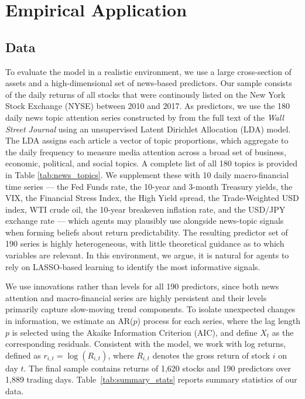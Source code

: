 \section{Empirical Application}\label{sec:empirical}

\subsection{Data}

To evaluate the model in a realistic environment, we use a large cross-section of assets and a high-dimensional set of news-based predictors.
Our sample consists of the daily returns of all stocks that were continously listed on the New York Stock Exchange (NYSE) between 2010 and 2017.
As predictors, we use the 180 daily news topic attention series constructed by \citet{Bybee2021} from the full text of the \textit{Wall Street Journal} using an unsupervised Latent Dirichlet Allocation (LDA) model.
The LDA assigns each article a vector of topic proportions, which \citet{Bybee2021} aggregate to the daily frequency to measure media attention across a broad set of business, economic, political, and social topics.
A complete list of all 180 topics is provided in Table \ref{tab:news_topics}.
We supplement these with 10 daily macro-financial time series — the Fed Funds rate, the 10-year and 3-month Treasury yields, the VIX, the Financial Stress Index, the High Yield spread, the Trade-Weighted USD index, WTI crude oil, the 10-year breakeven inflation rate, and the USD/JPY exchange rate — which agents may plausibly use alongside news-topic signals when forming beliefs about return predictability.
The resulting predictor set of 190 series is highly heterogeneous, with little theoretical guidance as to which variables are relevant.
In this environment, we argue, it is natural for agents to rely on LASSO-based learning to identify the most informative signals.

We use innovations rather than levels for all 190 predictors, since both news attention and macro-financial series are highly persistent and their levels primarily capture slow-moving trend components.
To isolate unexpected changes in information, we estimate an AR($p$) process for each series, where the lag length $p$ is selected using the Akaike Information Criterion (AIC), and define $X_t$ as the corresponding residuals.
Consistent with the model, we work with log returns, defined as $r_{i,t} = \log(R_{i,t})$, where $R_{i,t}$ denotes the gross return of stock $i$ on day $t$.
The final sample contains returns of 1{,}620 stocks and 190 predictors over 1{,}889 trading days.
Table~\ref{tab:summary_stats} reports summary statistics of our data.

